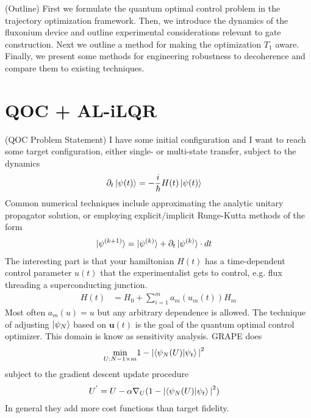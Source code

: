 \documentclass[
  amsfonts,
  amsmath,
  tbtags,
  amssymb,
  aps,
  nobibnotes,
  prl,
  twocolumn,
]{revtex4-2}
\begin{document}
(Outline)  First we formulate the quantum optimal control problem
in the trajectory optimization framework. Then, we introduce the dynamics
of the fluxonium device and outline experimental considerations
relevant to gate construction. Next we outline a method for
making the optimization $T_{1}$ aware. Finally, we present
some methods for engineering robustness to decoherence and
compare them to existing techniques.


\section{QOC + AL-iLQR}
(QOC Problem Statement) I have some initial
configuration and I want to reach some target configuration,
either single- or multi-state transfer, subject to the dynamics
\begin{align}
  \partial_{t} \ket{\psi(t)} &= -\frac{i}{\hbar} H(t) \ket{\psi(t)}
\end{align}
Common numerical techniques include approximating the analytic unitary propagator solution,
or employing explicit/implicit Runge-Kutta methods of the form
\begin{align}
  \ket{\psi^{(k + 1)}} &= \ket{\psi^{(k)}} + \partial_{t} \ket{\psi^{(k)}} \cdot dt
\end{align}
The interesting part is that your hamiltonian $H(t)$ has a time-dependent
control parameter $u(t)$ that the experimentalist gets to control, e.g. flux threading
a superconducting junction.
\begin{align}
  H(t) &= H_{0} + \sum_{i = 1}^{m} a_{m}(u_{m}(t)) H_{m}
\end{align}
Most often $a_{m}(u) = u$ but any arbitrary dependence is allowed.
The technique of adjusting $\ket{\psi_{N}}$ based on $\textbf{u}(t)$
is the goal of the quantum optimal control optimizer. This domain is
know as sensitivity analysis. GRAPE does
\begin{align}
  \min_{U:N-1 \times m} &1 - {\lvert \braket{\psi_{N}(U) \lvert \psi_{t}} \lvert}^{2}
\end{align}
subject to the gradient descent update procedure
\begin{align}
  U^{'} &= U - \alpha \nabla_{U} (1 - {\lvert \braket{\psi_{N}(U) \lvert \psi_{t}} \lvert}^{2})
\end{align}
In general they add more cost functions than target fidelity.
\end{document}
